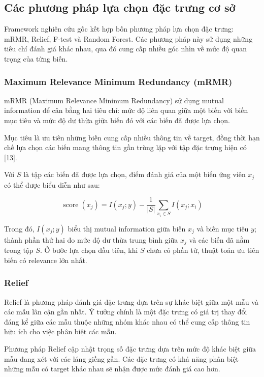 \subsection{Các phương pháp lựa chọn đặc trưng cơ sở}
\label{subsec:base-selectors-theory}

Framework nghiên cứu gốc kết hợp bốn phương pháp lựa chọn đặc trưng:
mRMR, Relief, F-test và Random Forest. Các phương pháp này sử dụng
những tiêu chí đánh giá khác nhau, qua đó cung cấp nhiều góc nhìn
về mức độ quan trọng của từng biến.

\subsubsection{Maximum Relevance Minimum Redundancy (mRMR)}

mRMR (Maximum Relevance Minimum Redundancy) sử dụng mutual information
để cân bằng hai tiêu chí: mức độ liên quan giữa một biến với biến mục
tiêu và mức độ dư thừa giữa biến đó với các biến đã được lựa chọn.

Mục tiêu là ưu tiên những biến cung cấp nhiều thông tin về target,
đồng thời hạn chế lựa chọn các biến mang thông tin gần trùng lặp
với tập đặc trưng hiện có [13].

Với $S$ là tập các biến đã được lựa chọn, điểm đánh giá của một biến
ứng viên $x_j$ có thể được biểu diễn như sau:

\begin{equation}
    \operatorname{score}(x_j)
    =
    I(x_j;y)
    -
    \frac{1}{|S|}
    \sum_{x_i \in S} I(x_j;x_i)
    \label{eq:mrmr-original}
\end{equation}

Trong đó, $I(x_j;y)$ biểu thị mutual information giữa biến $x_j$
và biến mục tiêu $y$; thành phần thứ hai đo mức độ dư thừa trung bình
giữa $x_j$ và các biến đã nằm trong tập $S$. Ở bước lựa chọn đầu tiên,
khi $S$ chưa có phần tử, thuật toán ưu tiên biến có relevance lớn nhất.

\subsubsection{Relief}

Relief là phương pháp đánh giá đặc trưng dựa trên sự khác biệt giữa
một mẫu và các mẫu lân cận gần nhất. Ý tưởng chính là một đặc trưng
có giá trị thay đổi đáng kể giữa các mẫu thuộc những nhóm khác nhau
có thể cung cấp thông tin hữu ích cho việc phân biệt các mẫu.

Phương pháp Relief cập nhật trọng số đặc trưng dựa trên mức độ khác
biệt giữa mẫu đang xét với các láng giềng gần. Các đặc trưng có khả
năng phân biệt những mẫu có target khác nhau sẽ nhận được mức đánh
giá cao hơn.

